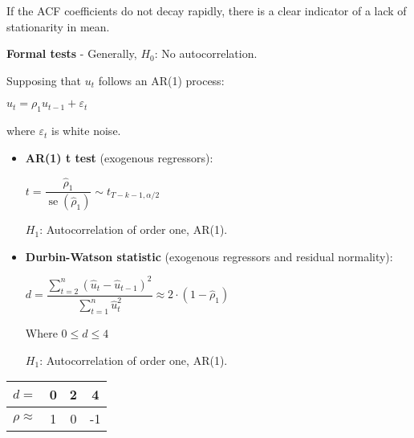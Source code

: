 \documentclass[10pt, a4paper, landscape]{article}
\DeclareMathOperator{\se}{se}
\begin{document}
\begin{multicols}{3}
If the ACF coefficients do not decay rapidly, there is a clear indicator of a lack of stationarity in mean.

\textbf{Formal tests} - Generally, \( H_{0} \): No autocorrelation.

Supposing that \( u_{t} \) follows an AR(1) process:

\begin{center}
	\( u_{t} = \rho_{1} u_{t - 1} + \varepsilon_{t} \)
\end{center}

where \( \varepsilon_{t} \) is white noise.

\begin{itemize}[leftmargin=*]
	\item \textbf{AR(1) t test} (exogenous regressors):
	\begin{center}
		\( t = \dfrac{\hat{\rho}_{1}}{\se(\hat{\rho}_{1})} \sim t_{T - k - 1, \alpha / 2} \)
	\end{center}
	\( H_{1} \): Autocorrelation of order one, AR(1).
\end{itemize}

\begin{itemize}[leftmargin=*]
	\item \textbf{Durbin-Watson statistic} (exogenous regressors and residual normality):
	\begin{center}
		\( d = \dfrac{\sum_{t = 2}^{n} (\hat{u}_{t} - \hat{u}_{t - 1})^{2}}{\sum_{t = 1}^{n} \hat{u}_{t}^{2}} \approx 2 \cdot (1 - \hat{\rho}_{1}) \)
	\end{center}
	Where \( 0 \leq d \leq 4 \)

	\( H_{1} \): Autocorrelation of order one, AR(1).
\end{itemize}

\begin{center}
	\begin{tabular}{ c | c | c | c }
		\( d = \)          & 0 & 2 & 4  \\ \hline
		\( \rho \approx \) & 1 & 0 & -1
	\end{tabular}


\end{center}
\end{multicols}
\end{document}
